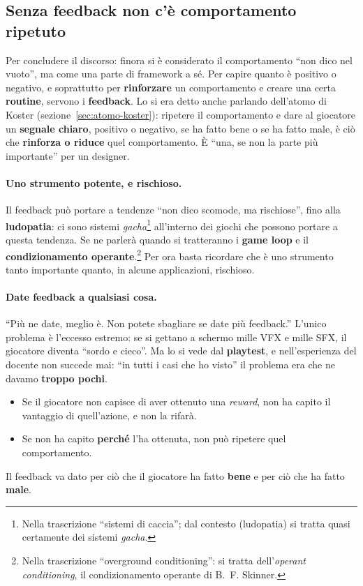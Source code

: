 

\subsection{Senza feedback non c'è comportamento ripetuto}

Per concludere il discorso: finora si è considerato il comportamento ``non
dico nel vuoto'', ma come una parte di framework a sé. Per capire quanto è
positivo o negativo, e soprattutto per \textbf{rinforzare} un comportamento e
creare una certa \textbf{routine}, servono i \textbf{feedback}. Lo si era
detto anche parlando dell'atomo di Koster (sezione~\ref{sec:atomo-koster}):
ripetere il comportamento e dare al giocatore un \textbf{segnale chiaro},
positivo o negativo, se ha fatto bene o se ha fatto male, è ciò che
\textbf{rinforza o riduce} quel comportamento. È ``una, se non la parte più
importante'' per un designer.

\paragraph{Uno strumento potente, e rischioso.} Il feedback può portare a
tendenze ``non dico scomode, ma rischiose'', fino alla
\textbf{ludopatia}: ci sono sistemi \emph{gacha}\footnote{Nella trascrizione
``sistemi di caccia''; dal contesto (ludopatia) si tratta quasi certamente
dei sistemi \emph{gacha}.} all'interno dei giochi che possono portare a
questa tendenza. Se ne parlerà quando si tratteranno i \textbf{game loop} e
il \textbf{condizionamento operante}.\footnote{Nella trascrizione
``overground conditioning'': si tratta dell'\emph{operant conditioning},
il condizionamento operante di B.~F. Skinner.} Per ora basta ricordare che
è uno strumento tanto importante quanto, in alcune applicazioni,
rischioso.

\paragraph{Date feedback a qualsiasi cosa.} ``Più ne date, meglio è. Non
potete sbagliare se date più feedback.'' L'unico problema è l'eccesso
estremo: se si gettano a schermo mille VFX e mille SFX, il giocatore diventa
``sordo e cieco''. Ma lo si vede dal \textbf{playtest}, e nell'esperienza del
docente non succede mai: ``in tutti i casi che ho visto'' il problema era che
ne davamo \textbf{troppo pochi}.
\begin{itemize}
  \item Se il giocatore non capisce di aver ottenuto una \emph{reward}, non
        ha capito il vantaggio di quell'azione, e non la rifarà.
  \item Se non ha capito \textbf{perché} l'ha ottenuta, non può ripetere
        quel comportamento.
\end{itemize}
Il feedback va dato per ciò che il giocatore ha fatto \textbf{bene} e per ciò
che ha fatto \textbf{male}.

